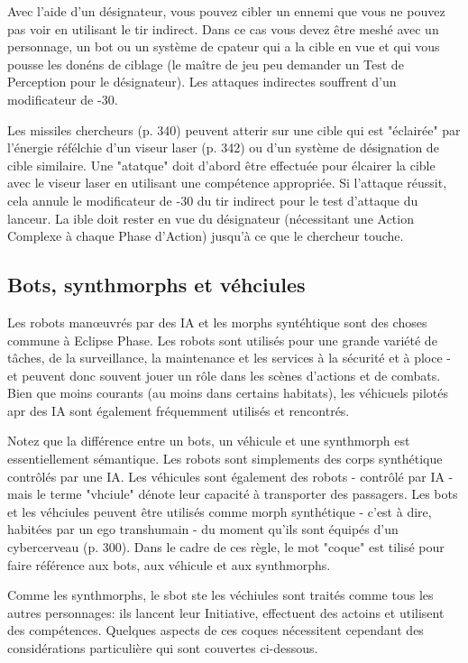 Avec l'aide d'un désignateur, vous pouvez cibler un ennemi que vous ne pouvez pas voir en utilisant le tir indirect. Dans ce cas vous devez être meshé avec un personnage, un bot ou un système de cpateur qui a la cible en vue et qui vous pousse les donéns de ciblage (le maître de jeu peu demander un Test de Perception pour le désignateur). Les attaques indirectes souffrent d'un modificateur de -30. 

Les missiles chercheurs (p. 340) peuvent atterir sur une cible qui est "éclairée" par l'énergie réfélchie d'un viseur laser (p. 342) ou d'un système de désignation de cible similaire. Une "atatque" doit d'abord être effectuée pour élcairer la cible avec le viseur laser en utilisant une compétence appropriée. Si l'attaque réussit, cela annule le modificateur de -30 du tir indirect pour le test d'attaque du lanceur. La ible doit rester en vue du désignateur (nécessitant une Action Complexe à chaque Phase d'Action) jusqu'à ce que le chercheur touche. 

\subsection{Bots, synthmorphs et véhciules} \label{sec:bots-synthmorphs-vehicles} 

Les robots manœuvrés par des IA et les morphs syntéhtique sont des choses commune à Eclipse Phase. Les robots sont utilisés pour une grande variété de tâches, de la surveillance, la maintenance et les services à la sécurité et à ploce - et peuvent donc souvent jouer un rôle dans les scènes d'actions et de combats. Bien que moins courants (au moins dans certains habitats), les véhicuels pilotés apr des IA sont également fréquemment utilisés et rencontrés. 

Notez que la différence entre un bots, un véhicule et une synthmorph est essentiellement sémantique. Les robots sont simplements des corps synthétique contrôlés par une IA. Les véhicules sont également des robots - contrôlé par IA - mais le terme "vhciule" dénote leur capacité à transporter des passagers. Les bots et les véhciules peuvent être utilisés comme morph synthétique - c'est à dire, habitées par un ego transhumain - du moment qu'ils sont équipés d'un cybercerveau (p. 300). Dans le cadre de ces règle, le mot "coque" est tilisé pour faire référence aux bots, aux véhicule et aux synthmorphs. 

Comme les synthmorphs, le sbot ste les véchiules sont traités comme tous les autres personnages: ils lancent leur Initiative, effectuent des actoins et utilisent des compétences. Quelques aspects de ces coques nécessitent cependant des considérations particulière qui sont couvertes ci-dessous. 

